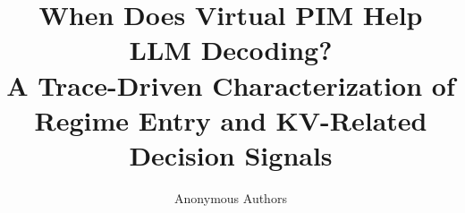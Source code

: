 \documentclass{article}
\title{When Does Virtual PIM Help LLM Decoding?\\
A Trace-Driven Characterization of Regime Entry and KV-Related Decision Signals}
\author{Anonymous Authors}
\theoremstyle{plain}
\theoremstyle{definition}
\theoremstyle{remark}
\begin{document}
\maketitle

\begin{abstract}

\end{abstract}










\newpage
\appendix

\end{document}
